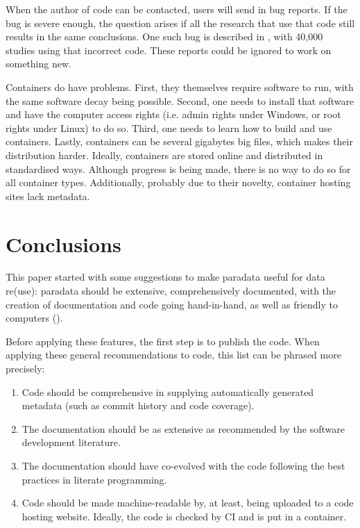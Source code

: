
When the author of code can be contacted,
users will send in bug reports.
If the bug is severe enough, the question arises
if all the research that use that code still 
results in the same conclusions.
One such bug is described in \cite{eklund2016cluster},
with 40,000 studies using that incorrect code.
These reports could be ignored to work on something new.


Containers do have problems.
First, they themselves require software to run,
with the same software decay being possible.
Second, one needs to install that software and have the
computer access rights (i.e. admin rights under Windows, 
or root rights under Linux) to do so.
Third, one needs to learn how to build and use containers.
Lastly, containers can be several gigabytes big files,
which makes their distribution harder.
Ideally, containers are stored online and distributed in
standardised ways.
Although progress is being made, 
there is no way to do so for all container types.
Additionally, probably due to their novelty,
container hosting sites lack metadata.

\section{Conclusions}

This paper started with some suggestions to 
make paradata useful for data re(use):
paradata should be extensive, comprehensively documented,
with the creation of documentation and code going hand-in-hand,
as well as friendly to computers (\cite{huvila2022improving}).

Before applying these features, the first step is to publish 
the code. 
When applying these general recommendations to code, 
this list can be phrased more precisely:

\begin{enumerate}
  \item Code should be comprehensive 
    in supplying automatically generated metadata (such as commit history and code coverage).
  \item The documentation should be as extensive as recommended by the 
    software development literature.
  \item The documentation should have co-evolved with the
    code following the best practices in literate programming. 
  \item Code should be made machine-readable by, at least,
    being uploaded to a code hosting website.
    Ideally, the code is checked by CI and is put in a container.
\end{enumerate}


